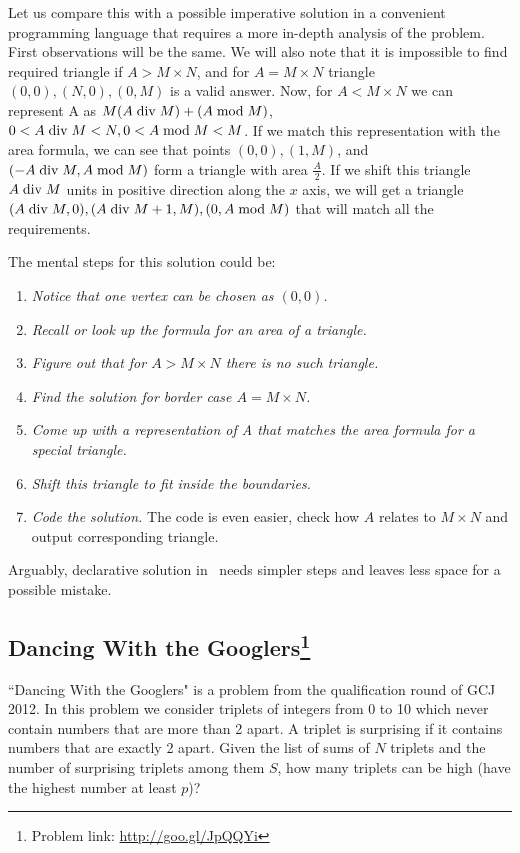 \documentclass{acm_proc_article-sp}
\begin{document}
Let us compare this with a possible imperative
solution in a convenient programming language that requires a more in-depth analysis of the problem.
First observations will be the same. We will also note that it is impossible to find required triangle
if $A > M \times N$, and for $A = M \times N$ triangle $(0,0), (N,0), (0,M)$ is a valid answer.
Now, for $A < M \times N$ we can represent A as $M(A \bdiv M) + (A \bmod M)$, $0 < A \bdiv M < N, 0 < A \bmod M < M$. 
If we match this representation with the area formula, we can see that points $(0, 0), (1, M)$, and $(- A \bdiv M, A \bmod M)$
form a triangle with area $\frac{A}{2}$. If we shift this triangle $A \bdiv M$ units in positive direction along the $x$ axis, we will get 
a triangle $(A \bdiv M, 0), (A \bdiv M + 1, M), (0, A \bmod M)$ that will match all the requirements.

The mental steps for this solution could be:

\begin{enumerate}
\item \textit{Notice that one vertex can be chosen as $(0,0)$.}
\item \textit{Recall or look up the formula for an area of a triangle.}
\item \textit{Figure out that for $A > M \times N$ there is no such triangle.}
\item \textit{Find the solution for border case $A = M \times N$.}
\item \textit{Come up with a representation of A that matches the area formula for a special triangle.}
\item \textit{Shift this triangle to fit inside the boundaries.}
\item \textit{Code the solution.} The code is even easier, check how $A$ relates to $M \times N$ and output corresponding triangle.
\end{enumerate}

Arguably, declarative solution in \eclipse\ needs simpler steps and leaves less space for a possible mistake.

\subsection*{Dancing With the Googlers\footnote{Problem link: \url{http://goo.gl/JpQQYi}}}

``Dancing With the Googlers" is a problem from the qualification round of GCJ 2012.
In this problem we consider triplets of integers from 0 to 10 which
never contain numbers that are more than 2 apart. A triplet is
surprising if it contains numbers that are exactly 2 apart. Given the list of
sums of $N$ triplets and the number of surprising triplets among them
$S$, how many triplets can be high (have the highest number at least $p$)?
 
\end{document}
